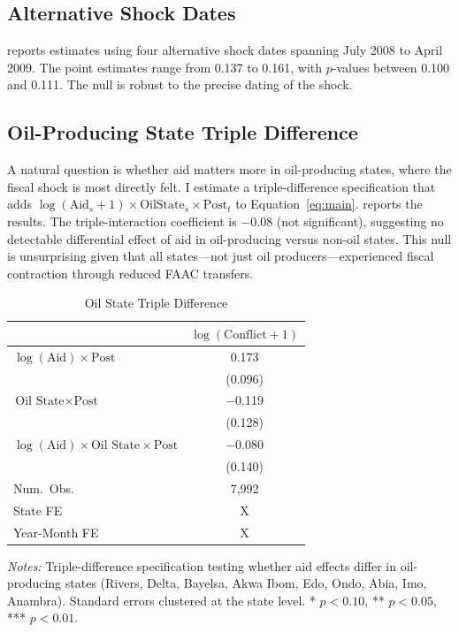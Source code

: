 \documentclass[12pt]{article}
\begin{document}
\subsection{Alternative Shock Dates}

 reports estimates using four alternative shock dates spanning July 2008 to April 2009. The point estimates range from 0.137 to 0.161, with $p$-values between 0.100 and 0.111. The null is robust to the precise dating of the shock.



\subsection{Oil-Producing State Triple Difference}

A natural question is whether aid matters more in oil-producing states, where the fiscal shock is most directly felt. I estimate a triple-difference specification that adds $\log(\text{Aid}_s + 1) \times \text{OilState}_s \times \text{Post}_t$ to Equation~\eqref{eq:main}.  reports the results. The triple-interaction coefficient is $-0.08$ (not significant), suggesting no detectable differential effect of aid in oil-producing versus non-oil states. This null is unsurprising given that all states---not just oil producers---experienced fiscal contraction through reduced FAAC transfers.

\begin{table}[H]
\centering
\caption{Oil State Triple Difference}
\label{tab:triple_diff}
\begin{tabular}{lc}
\toprule
 & $\log(\text{Conflict} + 1)$ \\
\midrule
$\log(\text{Aid}) \times \text{Post}$ & 0.173 \\
 & (0.096) \\
$\text{Oil State} \times \text{Post}$ & $-$0.119 \\
 & (0.128) \\
$\log(\text{Aid}) \times \text{Oil State} \times \text{Post}$ & $-$0.080 \\
 & (0.140) \\
\midrule
Num.\ Obs. & 7,992 \\
State FE & X \\
Year-Month FE & X \\
\bottomrule
\end{tabular}
\par\vspace{0.3em}
{\footnotesize \emph{Notes:} Triple-difference specification testing whether aid effects differ in oil-producing states (Rivers, Delta, Bayelsa, Akwa Ibom, Edo, Ondo, Abia, Imo, Anambra). Standard errors clustered at the state level. * $p < 0.10$, ** $p < 0.05$, *** $p < 0.01$.}
\end{table}
\end{document}
